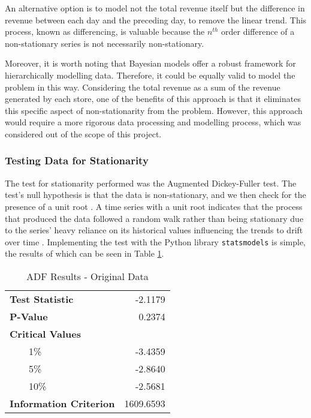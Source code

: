 An alternative option is to model not the total revenue itself but the
difference in revenue between each day and the preceding day, to remove the
linear trend. This process, known as differencing, is valuable because the
$n^{th}$ order difference of a non-stationary series is not necessarily
non-stationary.

Moreover, it is worth noting that Bayesian models offer a robust framework for
hierarchically modelling data. Therefore, it could be equally valid to model
the problem in this way. Considering the total revenue as a sum of the revenue
generated by each store, one of the benefits of this approach is that it
eliminates this specific aspect of non-stationarity from the problem. However,
this approach would require a more rigorous data processing and modelling
process, which was considered out of the scope of this project.

\subsubsection{Testing Data for Stationarity}
The test for stationarity performed was the Augmented Dickey-Fuller test. The
test's null hypothesis is that the data is non-stationary, and we then check
for the presence of a unit root \cite{adf}. A time series with a unit root
indicates that the process that produced the data followed a random walk rather
than being stationary due to the series' heavy reliance on its
historical values influencing the trends to drift over time \cite{adf}.
Implementing the test with the Python library \texttt{statsmodels} is simple,
the results of which can be seen in Table \ref{tab:adf_og}. 
\begin{table}[h]
\centering
\caption{ADF Results - Original Data}
\label{tab:adf_og}
\begin{tabular}{@{} >{\arraybackslash}l r @{}}
\toprule
\textbf{Test Statistic} & -2.1179 \\ \addlinespace[0.1em]
\textbf{P-Value} & 0.2374 \\ \addlinespace[0.1em]
\textbf{Critical Values} & \\ 
\ \ \ \ 1\% & -3.4359 \\ 
\ \ \ \ 5\% & -2.8640 \\ 
\ \ \ \ 10\% & -2.5681 \\ \addlinespace[0.1em]
\textbf{Information Criterion} & 1609.6593 \\ 
\bottomrule
\end{tabular}
\end{table}

